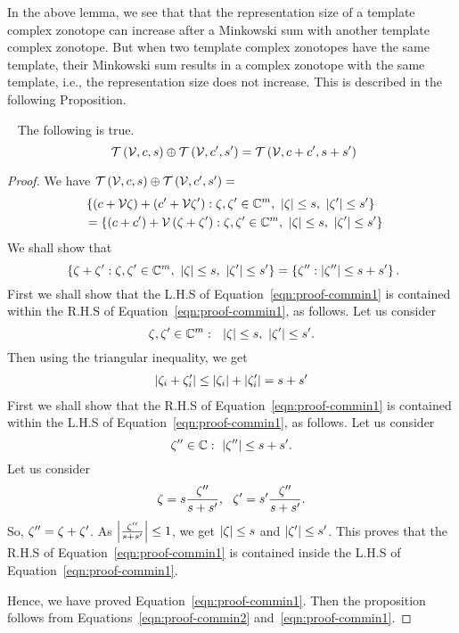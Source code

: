 %
In the above lemma, we see that that the representation size of a
template complex zonotope can increase after a Minkowski sum with
another template complex zonotope.  But when two template complex
zonotopes have the same template, their Minkowski sum results in a
complex zonotope with the same template, i.e., the representation size
does not increase.  This is described in the following Proposition.
%
\begin{proposition}~\label{prop:commin}
The following is true.
%
\begin{equation}~\label{eqn:common-minkowski}
\mathit{\operatorname{\mathcal{T}}}\left(\mathcal{V},c,s\right)\oplus \mathit{\operatorname{\mathcal{T}}}\left(\mathcal{V},c^\prime,s^\prime\right)=\mathit{\operatorname{\mathcal{T}}}\left(\mathcal{V},c+c^\prime,s+s^\prime\right)
\end{equation}
%
\end{proposition}
%
\begin{proof}
We have $\mathit{\operatorname{\mathcal{T}}}\left(\mathcal{V},c,s\right)\oplus \mathit{\operatorname{\mathcal{T}}}\left(\mathcal{V},c^\prime,s^\prime\right)=$
%
\begin{align}~\label{eqn:proof-commin2}
&
\left\{\left(c+\mathcal{V}\zeta\right)+\left(c^\prime+\mathcal{V}\zeta^\prime\right):\zeta,\zeta^\prime\in\mathbb{C}^m,~\left|\zeta\right|\leq
s,~\left|\zeta^\prime\right|\leq s^\prime\right\}\nonumber\\
& = \left\{\left(c+c^\prime\right)+\mathcal{V}\left(\zeta+\zeta^\prime\right):\zeta,\zeta^\prime\in\mathbb{C}^m,~\left|\zeta\right|\leq
s,~\left|\zeta^\prime\right|\leq s^\prime\right\}
\end{align}
%
We shall show that
\begin{equation}~\label{eqn:proof-commin1}
\left\{\zeta+\zeta^\prime:\zeta,\zeta^\prime\in\mathbb{C}^m,~\left|\zeta\right|\leq
s,~\left|\zeta^\prime\right|\leq s^\prime\right\}=\left\{\zeta^{\prime\prime}:\left|\zeta^{\prime\prime}\right|\leq s+s^\prime \right\}.
\end{equation}
%
First we shall show that the L.H.S of Equation~\ref{eqn:proof-commin1} is
contained within the R.H.S of Equation~\ref{eqn:proof-commin1}, as follows.  Let
us consider
%
\[
\zeta,\zeta^\prime\in\mathbb{C}^m:~~\left|\zeta\right|\leq
s,~\left|\zeta^\prime\right|\leq s^\prime.
\]
%
Then using the triangular inequality, we get
%
\begin{align*}
\left|\zeta_i+\zeta^\prime_i\right|\leq
\left|\zeta_i\right|+\left|\zeta^\prime_i\right|=s+s^\prime
\end{align*}
%
First we shall show that the R.H.S of Equation~\ref{eqn:proof-commin1} is
contained within the L.H.S of Equation~\ref{eqn:proof-commin1}, as follows.  
Let us consider
%
\[
\zeta^{\prime\prime}\in\mathbb{C}:~\left|\zeta^{\prime\prime}\right|\leq s+s^\prime.
\]
%
Let us consider
%
\[
\zeta=s\frac{\zeta^{\prime\prime}}{s+s^\prime},~~\zeta^\prime=s^\prime\frac{\zeta^{\prime\prime}}{s+s^\prime}.
\]
%
So, $\zeta^{\prime\prime}=\zeta+\zeta^\prime$.  As
$\left|\frac{\zeta^{\prime\prime}}{s+s^\prime}\right|\leq 1$, we get
$\left|\zeta\right|\leq s$ and
$\left|\zeta^\prime\right|\leq s^\prime$.  This proves that
the R.H.S of Equation~\ref{eqn:proof-commin1} is contained inside the
L.H.S of Equation~\ref{eqn:proof-commin1}.

Hence, we have proved Equation~\ref{eqn:proof-commin1}.  Then the
proposition follows from
Equations~\ref{eqn:proof-commin2} and~\ref{eqn:proof-commin1}.
\end{proof}
